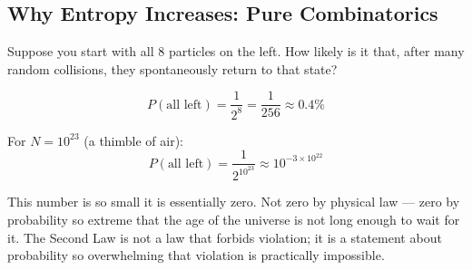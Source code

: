 \documentclass[12pt, a4paper, twoside]{book}
\begin{document}
\subsection{Why Entropy Increases: Pure Combinatorics}

Suppose you start with all 8 particles on the left. How likely is it that, after many random collisions, they spontaneously return to that state?

\begin{equation}
  P(\text{all left}) = \frac{1}{2^8} = \frac{1}{256} \approx 0.4\%
\end{equation}

For $N = 10^{23}$ (a thimble of air):
\begin{equation}
  P(\text{all left}) = \frac{1}{2^{10^{23}}} \approx 10^{-3\times10^{22}}
\end{equation}

This number is so small it is essentially zero. Not zero by physical law --- zero by probability so extreme that the age of the universe is not long enough to wait for it. The Second Law is not a law that forbids violation; it is a statement about probability so overwhelming that violation is practically impossible.
\end{document}
